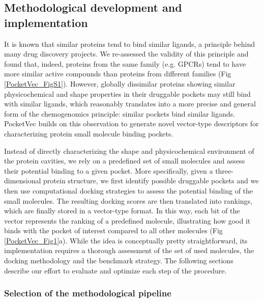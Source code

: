 
\subsection{Methodological development and implementation}

It is known that similar proteins tend to bind similar ligands\cite{klabunde_chemogenomic_2007}, a principle behind many drug discovery projects\cite{sydow_advances_2019, keiser_relating_2007, falaguera_illuminating_2023}. We re-assessed the validity of this principle and found that, indeed, proteins from the same family (e.g. GPCRs) tend to have more similar active compounds than proteins from different families (Fig \ref{PocketVec_FigS1}). However, globally dissimilar proteins showing similar physicochemical and shape properties in their druggable pockets may still bind with similar ligands, which reasonably translates into a more precise and general form of the chemogenomics principle: similar pockets bind similar ligands\cite{gao_comprehensive_2013}. PocketVec builds on this observation to generate novel vector-type descriptors for characterizing protein small molecule binding pockets. 

Instead of directly characterizing the shape and physicochemical environment of the protein
cavities, we rely on a predefined set of small molecules and assess their potential binding to a
given pocket. More specifically, given a three-dimensional protein structure, we first identify
possible druggable pockets and we then use computational docking strategies to assess the
potential binding of the small molecules. The resulting docking scores are then translated into
rankings, which are finally stored in a vector-type format. In this way, each bit of the vector
represents the ranking of a predefined molecule, illustrating how good it binds with the pocket of
interest compared to all other molecules (Fig \ref{PocketVec_Fig1}a). While the idea is conceptually pretty straightforward, its implementation requires a thorough assessment of the set of used molecules, the docking methodology and the benchmark strategy. The following sections describe our effort to evaluate and optimize each step of the procedure.

\subsubsection{Selection of the methodological pipeline}

